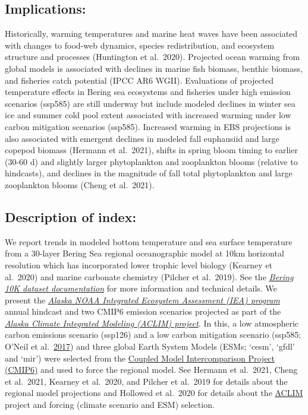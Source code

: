 \documentclass[
]{article}
\begin{document}
\hypertarget{implications}{%
\subsection{Implications:}\label{implications}}

Historically, warming temperatures and marine heat waves have been
associated with changes to food-web dynamics, species redistribution,
and ecosystem structure and processes (Huntington et al.~2020).
Projected ocean warming from global models is associated with declines
in marine fish biomass, benthic biomass, and fisheries catch potential
(IPCC AR6 WGII). Evaluations of projected temperature effects in Bering
sea ecosystems and fisheries under high emission scenarios (ssp585) are
still underway but include modeled declines in winter sea ice and summer
cold pool extent associated with increased warming under low carbon
mitigation scenarios (ssp585). Increased warming in EBS projections is
also associated with emergent declines in modeled fall euphausiid and
large copepod biomass (Hermann et al.~2021), shifts in spring bloom
timing to earlier (30-60 d) and slightly larger phytoplankton and
zooplankton blooms (relative to hindcasts), and declines in the
magnitude of fall total phytoplankton and large zooplankton blooms
(Cheng et al.~2021).

\hypertarget{description-of-index}{%
\subsection{Description of index:}\label{description-of-index}}

We report trends in modeled bottom temperature and sea surface
temperature from a 30-layer Bering Sea regional oceanographic model at
10km horizontal resolution which has incorporated lower trophic level
biology (Kearney et al.~2020) and marine carbonate chemistry (Pilcher et
al.~2019). See the
\href{https://zenodo.org/record/4586950/files/Bering10K_dataset_documentation.pdf}{\emph{Bering
10K dataset documentation}} for more information and technical details.
We present the
\href{www.integratedecosystemassessment.noaa.gov}{\emph{Alaska NOAA
Integrated Ecosystem Assessment (IEA) program}} annual hindcast and two
CMIP6 emission scenarios projected as part of the
\href{www.fisheries.noaa.gov/alaska/ecosystems/alaska-climate-integrated-modeling-project}{\emph{Alaska
Climate Integrated Modeling (ACLIM) project}}. In this, a low
atmospheric carbon emissions scenario (ssp126) and a low carbon
mitigation scenario (ssp585; O'Neil et
al.~\href{https://link.springer.com/article/10.1007/s10584-013-0905-2}{2017})
and three global Earth System Models (ESMs; `cesm', `gfdl' and `mir')
were selected from the
\href{https://www.wcrp-climate.org/wgcm-cmip/wgcm-cmip6}{Coupled Model
Intercomparison Project (CMIP6)} and used to force the regional model.
See Hermann et al.~2021, Cheng et al.~2021, Kearney et al.~2020, and
Pilcher et al.~2019 for details about the regional model projections and
Hollowed et al.~2020 for details about the
\href{www.fisheries.noaa.gov/alaska/ecosystems/alaska-climate-integrated-modeling-project}{ACLIM}
project and forcing (climate scenario and ESM) selection.
\end{document}
